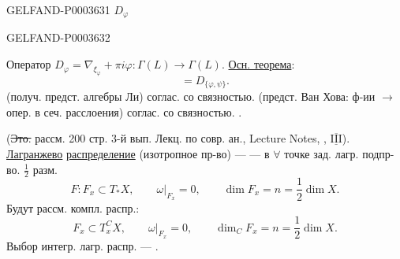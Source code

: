 \begin{GelfandAdjacentEvidence}{GELFAND-P000363}{1}
\sout{$D_\varphi$}
\end{GelfandAdjacentEvidence}
\begin{GelfandAdjacentEvidence}{GELFAND-P000363}{2}

Оператор $D_\varphi=\nabla_{\xi_\varphi}+\pi i\varphi:\Gamma(L)\to\Gamma(L)$.
\uline{Осн. теорема}:
\begin{equation*}[D_\varphi,D_\psi]=D_{\{\varphi,\psi\}}.\end{equation*}
(получ. предст. алгебры Ли) соглас. со связностью.
(предст. Ван Хова: ф-ии $\to$ опер. в сеч. расслоения) соглас. со связностью.
.



\end{GelfandAdjacentEvidence}

(\sout{Это.} рассм. 200 стр. 3-й вып. Лекц. по совр. ан., Lecture Notes,
, $\overline{\underline{\mathrm{III}}}$).
\uline{Лагранжево} \uline{распределение} (изотропное пр-во) ---
--- в $\forall$ точке зад. лагр. подпр-во. $\frac12$ разм.
\begin{equation*}F:F_x\subset T_*X,\qquad\omega|_{F_x}=0,\qquad\dim F_x=n=\frac12\dim X.\end{equation*}
Будут рассм. компл. распр.:
\begin{equation*}F_x\subset T_x^CX,\qquad\omega|_{F_x}=0,\qquad\dim_C F_x=n=\frac12\dim X.\end{equation*}
Выбор интегр. лагр. распр. --- .



